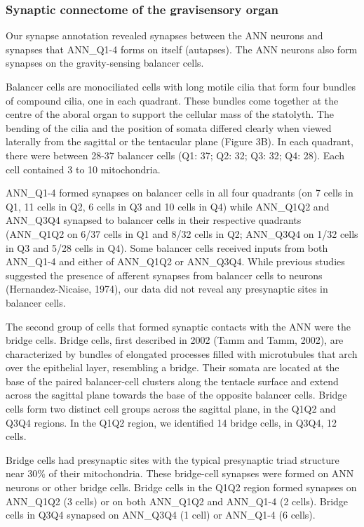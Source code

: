 \documentclass[
  11pt,
]{article}
\begin{document}
\begin{figure}[H]
\end{figure}%

\subsubsection{Synaptic connectome of the gravisensory
organ}\label{synaptic-connectome-of-the-gravisensory-organ}

Our synapse annotation revealed synapses between the ANN neurons and
synapses that ANN\_Q1-4 forms on itself (autapses). The ANN neurons also
form synapses on the gravity-sensing balancer cells.

Balancer cells are monociliated cells with long motile cilia that form
four bundles of compound cilia, one in each quadrant. These bundles come
together at the centre of the aboral organ to support the cellular mass
of the statolyth. The bending of the cilia and the position of somata
differed clearly when viewed laterally from the sagittal or the
tentacular plane (Figure 3B). In each quadrant, there were between 28-37
balancer cells (Q1: 37; Q2: 32; Q3: 32; Q4: 28). Each cell contained 3
to 10 mitochondria.

ANN\_Q1-4 formed synapses on balancer cells in all four quadrants (on 7
cells in Q1, 11 cells in Q2, 6 cells in Q3 and 10 cells in Q4) while
ANN\_Q1Q2 and ANN\_Q3Q4 synapsed to balancer cells in their respective
quadrants (ANN\_Q1Q2 on 6/37 cells in Q1 and 8/32 cells in Q2; ANN\_Q3Q4
on 1/32 cells in Q3 and 5/28 cells in Q4). Some balancer cells received
inputs from both ANN\_Q1-4 and either of ANN\_Q1Q2 or ANN\_Q3Q4. While
previous studies suggested the presence of afferent synapses from
balancer cells to neurons (Hernandez-Nicaise, 1974), our data did not
reveal any presynaptic sites in balancer cells.

The second group of cells that formed synaptic contacts with the ANN
were the bridge cells. Bridge cells, first described in 2002 (Tamm and
Tamm, 2002), are characterized by bundles of elongated processes filled
with microtubules that arch over the epithelial layer, resembling a
bridge. Their somata are located at the base of the paired balancer-cell
clusters along the tentacle surface and extend across the sagittal plane
towards the base of the opposite balancer cells. Bridge cells form two
distinct cell groups across the sagittal plane, in the Q1Q2 and Q3Q4
regions. In the Q1Q2 region, we identified 14 bridge cells, in Q3Q4, 12
cells.

Bridge cells had presynaptic sites with the typical presynaptic triad
structure near 30\% of their mitochondria. These bridge-cell synapses
were formed on ANN neurons or other bridge cells. Bridge cells in the
Q1Q2 region formed synapses on ANN\_Q1Q2 (3 cells) or on both ANN\_Q1Q2
and ANN\_Q1-4 (2 cells). Bridge cells in Q3Q4 synapsed on ANN\_Q3Q4 (1
cell) or ANN\_Q1-4 (6 cells).
\end{document}
